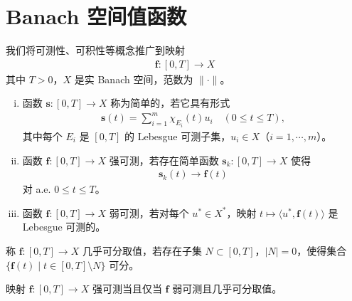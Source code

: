 \documentclass[../main.tex]{subfiles}
\begin{document}
\section{Banach 空间值函数}\label{section:appE-Banach值函数}

我们将可测性、可积性等概念推广到映射
\begin{align*}
\mathbf{f}:[0,T]\to X
\end{align*}
其中 $T>0$，$X$ 是实 Banach 空间，范数为 $\|\cdot\|$。

\begin{definition}\label{definition:appE-强可测}
\begin{enumerate}[(i)]
\item 函数 $\mathbf{s}:[0,T]\to X$ 称为简单的，若它具有形式
\begin{align}
\mathbf{s}(t)=\sum_{i=1}^m\chi_{E_i}(t)u_i \quad (0\leqslant t\leqslant T),
\label{align:appE-简单函数}
\end{align}
其中每个 $E_i$ 是 $[0,T]$ 的 Lebesgue 可测子集，$u_i\in X$（$i=1,\cdots,m$）。

\item 函数 $\mathbf{f}:[0,T]\to X$ 强可测，若存在简单函数 $\mathbf{s}_k:[0,T]\to X$ 使得
\begin{align*}
\mathbf{s}_k(t)\to\mathbf{f}(t)
\end{align*}
对 a.e. $0\leqslant t\leqslant T$。

\item 函数 $\mathbf{f}:[0,T]\to X$ 弱可测，若对每个 $u^*\in X^*$，映射 $t\mapsto\langle u^*,\mathbf{f}(t)\rangle$ 是 Lebesgue 可测的。
\end{enumerate}
\end{definition}

\begin{definition}\label{definition:appE-几乎可分}
称 $\mathbf{f}:[0,T]\to X$ 几乎可分取值，若存在子集 $N\subset[0,T]$，$|N|=0$，使得集合 $\{\mathbf{f}(t)\mid t\in[0,T]\setminus N\}$ 可分。
\end{definition}

\begin{theorem}[强可测与弱可测。]\label{theorem:appE-强弱可测}映射 $\mathbf{f}:[0,T]\to X$ 强可测当且仅当 $\mathbf{f}$ 弱可测且几乎可分取值。
\end{theorem}
\end{document}

